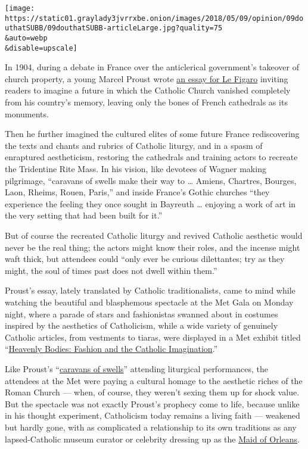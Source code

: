 \texttt{[image: https://static01.graylady3jvrrxbe.onion/images/2018/05/09/opinion/09douthatSUBB/09douthatSUBB-articleLarge.jpg?quality=75\\\&auto=webp\\\&disable=upscale]}

In 1904, during a debate in France over the anticlerical government's
takeover of church property, a young Marcel Proust wrote
\href{https://rorate-caeli.blogspot.com/2015/01/the-death-of-cathedrals-and-venerable.html}{an
essay for Le Figaro} inviting readers to imagine a future in which the
Catholic Church vanished completely from his country's memory, leaving
only the bones of French cathedrals as its monuments.

Then he further imagined the cultured elites of some future France
rediscovering the texts and chants and rubrics of Catholic liturgy, and
in a spasm of enraptured aestheticism, restoring the cathedrals and
training actors to recreate the Tridentine Rite Mass. In his vision,
like devotees of Wagner making pilgrimage, ``caravans of swells make
their way to \ldots{} Amiens, Chartres, Bourges, Laon, Rheims, Rouen,
Paris,'' and inside France's Gothic churches ``they experience the
feeling they once sought in Bayreuth \ldots{} enjoying a work of art in
the very setting that had been built for it.''

But of course the recreated Catholic liturgy and revived Catholic
aesthetic would never be the real thing; the actors might know their
roles, and the incense might waft thick, but attendees could ``only ever
be curious dilettantes; try as they might, the soul of times past does
not dwell within them.''

Proust's essay, lately translated by Catholic traditionalists, came to
mind while watching the beautiful and blasphemous spectacle at the Met
Gala on Monday night, where a parade of stars and fashionistas swanned
about in costumes inspired by the aesthetics of Catholicism, while a
wide variety of genuinely Catholic articles, from vestments to tiaras,
were displayed in a Met exhibit titled
``\href{https://www.metmuseum.org/exhibitions/listings/2018/heavenly-bodies}{Heavenly
Bodies: Fashion and the Catholic Imagination}.''

Like Proust's
``\href{https://rorate-caeli.blogspot.com/2015/01/the-death-of-cathedrals-and-venerable.html}{caravans
of swells}'' attending liturgical performances, the attendees at the Met
were paying a cultural homage to the aesthetic riches of the Roman
Church --- when, of course, they weren't sexing them up for shock value.
But the spectacle was not exactly Proust's prophecy come to life,
because unlike in his thought experiment, Catholicism today remains a
living faith --- weakened but hardly gone, with as complicated a
relationship to its own traditions as any lapsed-Catholic museum curator
or celebrity dressing up as the
\href{http://wwd.com/eye/lifestyle/zendaya-versace-joan-arc-2018-met-gala-1202667880/}{Maid
of Orleans}.

